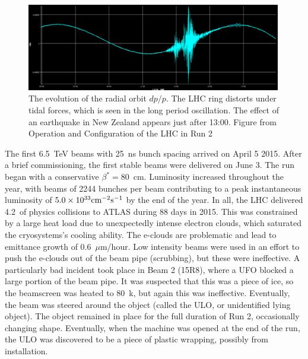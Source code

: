 \begin{figure}[h!]
\captionsetup[subfigure]{position=b}
\centering
\includegraphics[width=0.99\textwidth]{figures/experiment/lhc/tides.png}
\caption{The evolution of the radial orbit $dp/p$. The LHC ring distorts under tidal forces, which is seen in the long period oscillation. The effect of an earthquake in New Zealand appears just after 13:00. Figure from Operation and Configuration of the LHC in Run 2 \cite{lhcRun2}}
\label{fig:tides}
\end{figure}

The first 6.5~TeV beams with 25~ns bunch spacing arrived on April 5 2015.
After a brief commissioning, the first stable beams were delivered on June 3.
The run began with a conservative $\beta^*=80$~cm.
Luminosity increased throughout the year, with beams of 2244 bunches per beam contributing to a peak instantaneous luminosity of $5.0\times10^{33}\text{cm}^{-2}\text{s}^{-1}$ by the end of the year.
In all, the LHC delivered 4.2~\fb of physics collisions to ATLAS during 88 days in 2015.
This was constrained by a large heat load due to unexpectedly intense electron clouds, which saturated the cryosystems's cooling ability.
The e-clouds are problematic and lead to emittance growth of 0.6~$\mu$m/hour.
Low intensity beams were used in an effort to push the e-clouds out of the beam pipe (scrubbing), but these were ineffective.
A particularly bad incident took place in Beam 2 (15R8), where a UFO blocked a large portion of the beam pipe.
It was suspected that this was a piece of ice, so the beamscreen was heated to 80~k, but again this was ineffective.
Eventually, the beam was steered around the object (called the ULO, or unidentified lying object).
The object remained in place for the full duration of Run 2, occasionally changing shape.
Eventually, when the machine was opened at the end of the run, the ULO was discovered to be a piece of plastic wrapping, possibly from installation.

